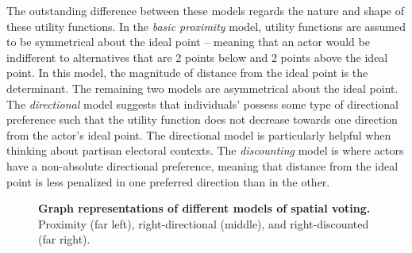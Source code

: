 \documentclass[10pt]{article}
\begin{document}
	The outstanding difference between these models regards the nature and shape of these utility functions. In the \textit{basic proximity} model, utility functions are assumed to be symmetrical about the ideal point -- meaning that an actor would be indifferent to alternatives that are 2 points below and 2 points above the ideal point. In this model, the magnitude of distance from the ideal point is the determinant. The remaining two models are asymmetrical about the ideal point. The \textit{directional} model suggests that individuals' possess some type of directional preference such that the utility function does not decrease towards one direction from the actor's ideal point. The directional model is particularly helpful when thinking about partisan electoral contexts. The \textit{discounting} model is where actors have a non-absolute directional preference, meaning that distance from the ideal point is less penalized in one preferred direction than in the other. 
	
	
	\begin{figure}[h]
		\centering
		\caption{\textbf{Graph representations of different models of spatial voting.} Proximity (far left), right-directional (middle), and right-discounted (far right).}
	\end{figure}
	
\end{document}
